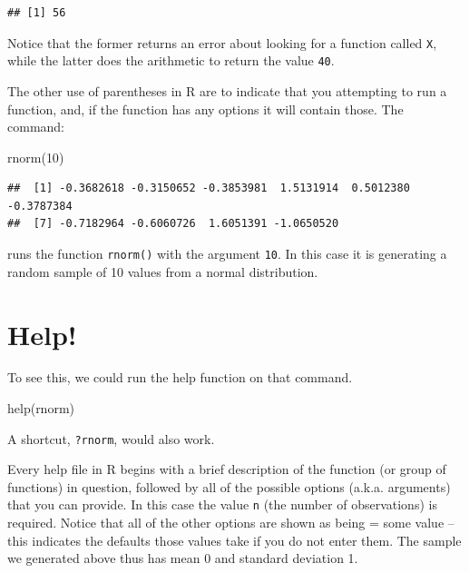 \documentclass[
]{book}
\newenvironment{Shaded}{\begin{snugshade}}{\end{snugshade}}
\newcommand{\DecValTok}[1]{\textcolor[rgb]{0.00,0.00,0.81}{#1}}
\newcommand{\FunctionTok}[1]{\textcolor[rgb]{0.00,0.00,0.00}{#1}}
\newcommand{\NormalTok}[1]{#1}
\begin{document}
\begin{verbatim}
## [1] 56
\end{verbatim}

Notice that the former returns an error about looking for a function called \texttt{X}, while the latter does the arithmetic to return the value \texttt{40}.

The other use of parentheses in R are to indicate that you attempting to run a function, and, if the function has any options it will contain those. The command:

\begin{Shaded}
\begin{Highlighting}[]
\FunctionTok{rnorm}\NormalTok{(}\DecValTok{10}\NormalTok{)}
\end{Highlighting}
\end{Shaded}

\begin{verbatim}
##  [1] -0.3682618 -0.3150652 -0.3853981  1.5131914  0.5012380 -0.3787384
##  [7] -0.7182964 -0.6060726  1.6051391 -1.0650520
\end{verbatim}

runs the function \texttt{rnorm()} with the argument \texttt{10}. In this case it is generating a random sample of 10 values from a normal distribution.

\hypertarget{help}{%
\section{Help!}\label{help}}

To see this, we could run the help function on that command.

\begin{Shaded}
\begin{Highlighting}[]
\FunctionTok{help}\NormalTok{(rnorm)}
\end{Highlighting}
\end{Shaded}

A shortcut, \texttt{?rnorm}, would also work.

Every help file in R begins with a brief description of the function (or group of functions) in question, followed by all of the possible options (a.k.a. arguments) that you can provide. In this case the value \texttt{n} (the number of observations) is required. Notice that all of the other options are shown as being = some value -- this indicates the defaults those values take if you do not enter them. The sample we generated above thus has mean 0 and standard deviation 1.
\end{document}
